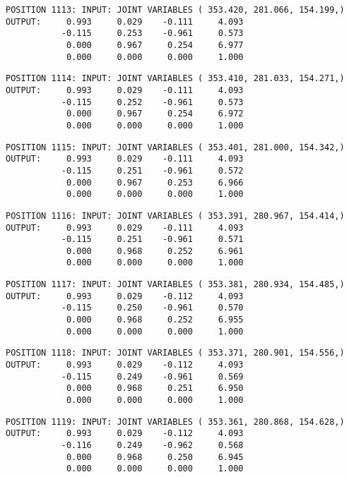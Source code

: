 \begin{verbatim}
POSITION 1113: INPUT: JOINT VARIABLES ( 353.420, 281.066, 154.199,)
OUTPUT:     0.993     0.029    -0.111     4.093
           -0.115     0.253    -0.961     0.573
            0.000     0.967     0.254     6.977
            0.000     0.000     0.000     1.000
\end{verbatim} \pagebreak[1]\begin{verbatim}
POSITION 1114: INPUT: JOINT VARIABLES ( 353.410, 281.033, 154.271,)
OUTPUT:     0.993     0.029    -0.111     4.093
           -0.115     0.252    -0.961     0.573
            0.000     0.967     0.254     6.972
            0.000     0.000     0.000     1.000
\end{verbatim} \pagebreak[1]\begin{verbatim}
POSITION 1115: INPUT: JOINT VARIABLES ( 353.401, 281.000, 154.342,)
OUTPUT:     0.993     0.029    -0.111     4.093
           -0.115     0.251    -0.961     0.572
            0.000     0.967     0.253     6.966
            0.000     0.000     0.000     1.000
\end{verbatim} \pagebreak[1]\begin{verbatim}
POSITION 1116: INPUT: JOINT VARIABLES ( 353.391, 280.967, 154.414,)
OUTPUT:     0.993     0.029    -0.111     4.093
           -0.115     0.251    -0.961     0.571
            0.000     0.968     0.252     6.961
            0.000     0.000     0.000     1.000
\end{verbatim} \pagebreak[1]\begin{verbatim}
POSITION 1117: INPUT: JOINT VARIABLES ( 353.381, 280.934, 154.485,)
OUTPUT:     0.993     0.029    -0.112     4.093
           -0.115     0.250    -0.961     0.570
            0.000     0.968     0.252     6.955
            0.000     0.000     0.000     1.000
\end{verbatim} \pagebreak[1]\begin{verbatim}
POSITION 1118: INPUT: JOINT VARIABLES ( 353.371, 280.901, 154.556,)
OUTPUT:     0.993     0.029    -0.112     4.093
           -0.115     0.249    -0.961     0.569
            0.000     0.968     0.251     6.950
            0.000     0.000     0.000     1.000
\end{verbatim} \pagebreak[1]\begin{verbatim}
POSITION 1119: INPUT: JOINT VARIABLES ( 353.361, 280.868, 154.628,)
OUTPUT:     0.993     0.029    -0.112     4.093
           -0.116     0.249    -0.962     0.568
            0.000     0.968     0.250     6.945
            0.000     0.000     0.000     1.000
\end{verbatim} \pagebreak[1]\begin{verbatim}

\end{verbatim}
